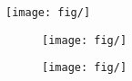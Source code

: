\begin{figure}[h!]
	\centering
	\texttt{[image: fig/]}
	\caption{}
	\label{fig:}
\end{figure}

\begin{figure}[h!]
	\centering
	\begin{subfigure}[b]{0.48\textwidth}
		\texttt{[image: fig/]}
		\caption{}
	\end{subfigure}
	\begin{subfigure}[b]{0.48\textwidth}
		\texttt{[image: fig/]}
		\caption{}
	\end{subfigure}
	\caption{}
	\label{fig:}
\end{figure}



